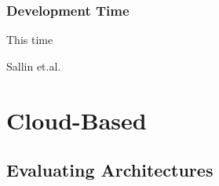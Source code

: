 \subsubsection{Development Time}
This time






Sallin et.al. \parencite{sallin_kropp_anslow_quilty_meier_2021}

\section{Cloud-Based}\label{state-of-the-art:s:cloud-based}

\subsection{Evaluating Architectures}\label{state-of-the-art:ss:evaluating-architectures}


